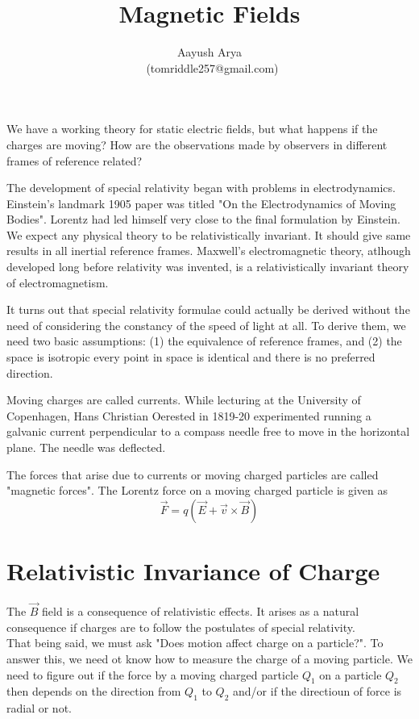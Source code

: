\documentclass{article}
\title{Magnetic Fields}
\author{Aayush Arya\\\ (tomriddle257@gmail.com)}
\begin{document}
	\maketitle
	We have a working theory for static electric fields, but what happens if the charges are moving? How are the observations made by observers in different frames of reference related?
	
	The development of special relativity began with problems in electrodynamics. Einstein's landmark 1905 paper was titled "On the Electrodynamics of Moving Bodies". Lorentz had led himself very close to the final formulation by Einstein.\\
	
	We expect any physical theory to be relativistically invariant. It should give same results in all inertial reference frames. Maxwell's electromagnetic theory, atlhough developed long before relativity was invented, is a relativistically invariant theory of electromagnetism.
	
	It turns out that special relativity formulae could actually be derived without the need of considering the constancy of the speed of light at all. To derive them, we need two basic assumptions: (1) the equivalence of reference frames, and (2) the space is isotropic \textemdash every point in space is identical and there is no preferred direction.
	
	Moving charges are called currents. While lecturing at the University of Copenhagen, Hans Christian Oerested in 1819-20 experimented running a galvanic current perpendicular to a compass needle free to move in the horizontal plane. The needle was deflected.
	
	The forces that arise due to currents or moving charged particles are called "magnetic forces". The Lorentz force on a moving charged particle is given as $$ \vec{F} = q(\vec{E} + \vec{v}\times\vec{B}) $$
	
	\section{Relativistic Invariance of Charge}
	The $\vec{B}$ field is a consequence of relativistic effects. It arises as a natural consequence if charges are to follow the postulates of special relativity.\\
	That being said, we must ask "Does motion affect charge on a particle?". To answer this, we need ot know how to measure the charge of a moving particle. We need to figure out if the force by a moving charged particle $Q_1$ on a particle $Q_2$ then depends on the direction from $Q_1$ to $Q_2$ and/or if the directioun of force is radial or not.
	
\end{document}
